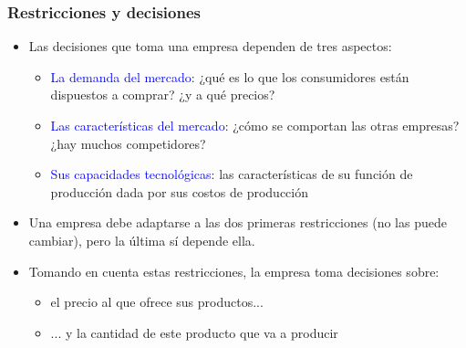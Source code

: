 \documentclass{beamer}
\begin{document}
\begin{frame}
\frametitle{Restricciones y decisiones}
\begin{itemize}
    \item Las decisiones que toma una empresa dependen de tres aspectos: \vspace{2mm}
        \begin{itemize} 
        \item \textcolor{blue}{La demanda del mercado}: ¿qué es lo que los consumidores están dispuestos a comprar? ¿y a qué precios?
        \item  \textcolor{blue}{Las características del mercado}: ¿cómo se comportan las otras empresas? ¿hay muchos competidores?
        \item  \textcolor{blue}{Sus capacidades tecnológicas}: las características de su función de producción dada por sus costos de producción  \vspace{2mm}
        \end{itemize}
    \item Una empresa debe adaptarse a las dos primeras restricciones (no las puede cambiar), pero la última sí depende ella.  \vspace{2mm}
    \item Tomando en cuenta estas restricciones, la empresa toma decisiones sobre:
    \begin{itemize}
        \item el precio al que ofrece sus productos...
        \item ... y la cantidad de este producto que va a producir
    \end{itemize}
\end{itemize} 
\end{frame}
\end{document}
